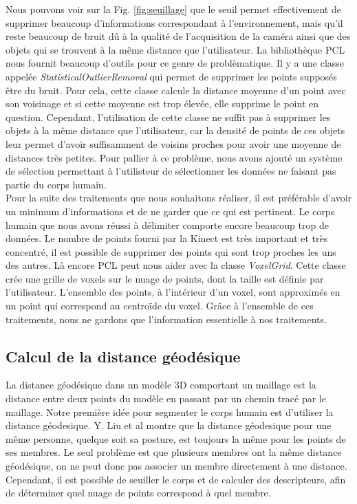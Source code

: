 Nous pouvons voir sur la Fig. \ref{fig:seuillage} que le seuil permet effectivement de supprimer beaucoup d'informations
correspondant à l'environnement, mais qu'il reste beaucoup de bruit dû à la qualité de l'acquisition de la caméra ainsi que 
des objets qui se trouvent à la même distance que l'utilisateur. La bibliothèque
PCL\cite{PCL} nous fournit beaucoup d'outils pour ce genre de problèmatique. Il y a une classe appelée \textit{StatisticalOutlierRemoval}
qui permet de supprimer les points supposés être du bruit. Pour cela, cette classe calcule la distance moyenne d'un point avec son
voisinage et si cette moyenne est trop élevée, elle supprime le point en question. Cependant, l'utilisation de cette classe ne
suffit pas à supprimer les objets à la même distance que l'utilisateur, car la densité de points de ces objets leur permet d'avoir
suffisamment de voisins proches pour avoir une moyenne de distances très petites. Pour pallier à ce problème, nous avons ajouté un
système de sélection permettant à l'utilisteur de sélectionner les données ne faisant pas partie du corps humain.\\

Pour la suite des traitements que nous souhaitons réaliser, il est préférable d'avoir un minimum d'informations et de ne garder
que ce qui est pertinent. Le corps humain que nous avons réussi à délimiter comporte encore beaucoup trop de données. Le nombre
de points fourni par la Kinect est très important et très concentré, il est possible de supprimer des points qui sont trop 
proches les uns des autres. Là encore PCL\cite{PCL} peut nous aider avec la classe \textit{VoxelGrid}. Cette classe crée une grille de
voxels sur le nuage de points, dont la taille est définie par l'utilisateur. L'ensemble des points, à l'intérieur d'un voxel, sont 
approximés en un point qui correspond au centroïde du voxel. Grâce à l'ensemble de ces traitements, nous ne gardons que l'information 
essentielle à nos traitements.

\subsection{Calcul de la distance géodésique}
La distance géodésique dans un modèle 3D comportant un maillage est la distance entre deux points du modèle en passant par un chemin
tracé par le maillage.
Notre première idée pour segmenter le corps humain est d'utiliser la distance géodesique. Y. Liu et al\cite{GIF} montre que la distance
géodesique pour une même personne, quelque soit sa posture, est toujours la même pour les points de ses membres. Le seul problème 
est que plusieurs membres ont la même distance géodésique, on ne peut donc pas associer un membre directement à une distance.
Cependant, il est possible de seuiller le corps et de calculer des descripteurs, afin de déterminer quel nuage de points
correspond à quel membre.\\

